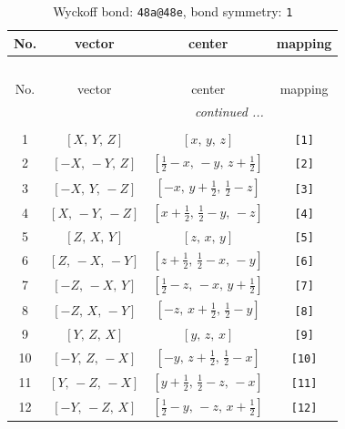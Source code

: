 \documentclass[fleqn,8pt]{jsarticle}
\begin{document}
\begin{longtable}{cccc}
\caption{Wyckoff bond: {\tt 48a@48e}, bond symmetry: {\tt 1}}
 \\
 \hline \hline
No. & vector & center & mapping \\ \hline \endfirsthead

\multicolumn{3}{l}{\tablename\ \thetable{}} \\
 \hline \hline
No. & vector & center & mapping \\ \hline \endhead

 \hline \hline
\multicolumn{3}{r}{\footnotesize\it continued ...} \\ \endfoot

 \hline \hline
\multicolumn{3}{r}{} \\ \endlastfoot

1 & $\left[ X,\, Y,\, Z \right]$ & $\left[ x,\, y,\, z \right]$ & {\tt [1]} \\ \hline
2 & $\left[ - X,\, - Y,\, Z \right]$ & $\left[ \frac{1}{2} - x,\, - y,\, z + \frac{1}{2} \right]$ & {\tt [2]} \\ \hline
3 & $\left[ - X,\, Y,\, - Z \right]$ & $\left[ - x,\, y + \frac{1}{2},\, \frac{1}{2} - z \right]$ & {\tt [3]} \\ \hline
4 & $\left[ X,\, - Y,\, - Z \right]$ & $\left[ x + \frac{1}{2},\, \frac{1}{2} - y,\, - z \right]$ & {\tt [4]} \\ \hline
5 & $\left[ Z,\, X,\, Y \right]$ & $\left[ z,\, x,\, y \right]$ & {\tt [5]} \\ \hline
6 & $\left[ Z,\, - X,\, - Y \right]$ & $\left[ z + \frac{1}{2},\, \frac{1}{2} - x,\, - y \right]$ & {\tt [6]} \\ \hline
7 & $\left[ - Z,\, - X,\, Y \right]$ & $\left[ \frac{1}{2} - z,\, - x,\, y + \frac{1}{2} \right]$ & {\tt [7]} \\ \hline
8 & $\left[ - Z,\, X,\, - Y \right]$ & $\left[ - z,\, x + \frac{1}{2},\, \frac{1}{2} - y \right]$ & {\tt [8]} \\ \hline
9 & $\left[ Y,\, Z,\, X \right]$ & $\left[ y,\, z,\, x \right]$ & {\tt [9]} \\ \hline
10 & $\left[ - Y,\, Z,\, - X \right]$ & $\left[ - y,\, z + \frac{1}{2},\, \frac{1}{2} - x \right]$ & {\tt [10]} \\ \hline
11 & $\left[ Y,\, - Z,\, - X \right]$ & $\left[ y + \frac{1}{2},\, \frac{1}{2} - z,\, - x \right]$ & {\tt [11]} \\ \hline
12 & $\left[ - Y,\, - Z,\, X \right]$ & $\left[ \frac{1}{2} - y,\, - z,\, x + \frac{1}{2} \right]$ & {\tt [12]} \\ \hline

\end{longtable}
\end{document}
